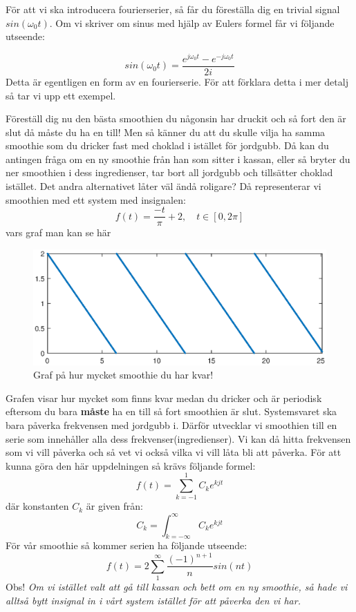 \documentclass{article}
\begin{document}
För att vi ska introducera fourierserier, så får du föreställa dig en trivial signal $sin(\omega_0 t)$. Om vi skriver om sinus med hjälp av Eulers formel får vi följande utseende:

\[sin(\omega_0 t) = \frac{e^{j \omega_0 t}  - e^{-j \omega_0 t}}{2i}\]
Detta är egentligen en form av en fourierserie. För att förklara detta i mer detalj så tar vi upp ett exempel.

Föreställ dig nu den bästa smoothien du någonsin har druckit och så fort den är slut då måste du ha en till! Men så känner du att du skulle vilja ha samma smoothie som du dricker fast med choklad i istället för jordgubb. Då kan du antingen fråga om en ny smoothie från han som sitter i kassan, eller så bryter du ner smoothien i dess ingredienser, tar bort all jordgubb och tillsätter choklad istället. Det andra alternativet låter väl ändå roligare?
Då representerar vi smoothien med ett system med insignalen:
\[ f(t) = \frac{-t}{\pi} + 2, \quad t \in [0,2 \pi] \]
vars graf man kan se här %
\begin{figure}[ht]
\centerline{\includegraphics[scale=0.55]{smoothie.eps}}
\caption{Graf på hur mycket smoothie du har kvar!}
\label{}
\end{figure}
Grafen visar hur mycket som finns kvar medan du dricker och är periodisk eftersom du bara \textbf{måste} ha en till så fort smoothien är slut. Systemsvaret ska bara påverka frekvensen med jordgubb i. Därför utvecklar vi smoothien till en serie som innehåller alla dess frekvenser(ingredienser). Vi kan då hitta frekvensen som vi vill påverka och så vet vi också vilka vi vill låta bli att påverka. För att kunna göra den här uppdelningen så krävs följande formel:
\[ f(t) = \sum_{k=-1}^1 C_k e^{k j t} \]
där konstanten $C_k$ är given från:
\[C_k = \int_{k=-\infty}^{\infty} C_k e^{k j t}\]
För vår smoothie så kommer serien ha följande utseende:
\[f(t) = 2 \sum_{1}^{\infty} \frac{(-1)^{n+1}}{n} sin(n t) \]
Obs! \emph{Om vi istället valt att gå till kassan och bett om en ny smoothie, så hade vi alltså bytt insignal in i vårt system istället för att påverka den vi har.}
\end{document}
